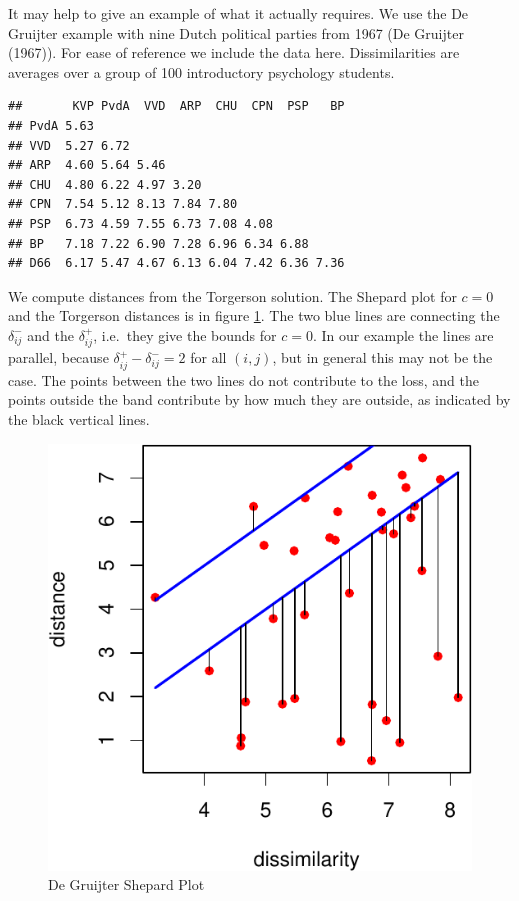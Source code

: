 \documentclass[
  12pt,
]{article}
\begin{document}
It may help to give an example of what it actually requires. We use the De Gruijter example
with nine Dutch political parties from 1967 (De Gruijter (1967)). For ease of reference we include the data here. Dissimilarities are averages over a group of 100 introductory psychology students.

\begin{verbatim}
##       KVP PvdA  VVD  ARP  CHU  CPN  PSP   BP
## PvdA 5.63                                   
## VVD  5.27 6.72                              
## ARP  4.60 5.64 5.46                         
## CHU  4.80 6.22 4.97 3.20                    
## CPN  7.54 5.12 8.13 7.84 7.80               
## PSP  6.73 4.59 7.55 6.73 7.08 4.08          
## BP   7.18 7.22 6.90 7.28 6.96 6.34 6.88     
## D66  6.17 5.47 4.67 6.13 6.04 7.42 6.36 7.36
\end{verbatim}

We compute distances from the Torgerson solution. The Shepard plot for \(c=0\) and the Torgerson distances is in figure \ref{fig:bandplot}. The two blue
lines are connecting the \(\delta_{ij}^-\) and the \(\delta_{ij}^+\), i.e.~they give
the bounds for \(c=0\). In our example the lines are parallel, because \(\delta_{ij}^+-\delta_{ij}^-=2\) for all \((i,j)\), but in general this may not be the case.
The points between the two lines do not contribute to the loss, and
the points outside the band contribute by how much they are outside, as indicated by the
black vertical lines.

\begin{figure}

{\centering \includegraphics{smacofAC_files/figure-latex/bandplot-1} 

}

\caption{De Gruijter Shepard Plot}\label{fig:bandplot}
\end{figure}
\end{document}
